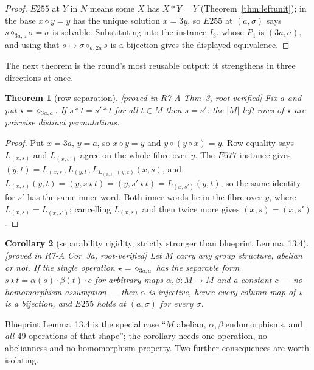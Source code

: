 \documentclass[11pt]{article}
\theoremstyle{plain}
\newtheorem{theorem}{Theorem}[section]
\newtheorem{corollary}[theorem]{Corollary}
\theoremstyle{definition}
\theoremstyle{remark}
\numberwithin{equation}{section}
\newcommand{\op}{\mathbin{*}}
\newcommand{\statusbox}[1]{{\small\sloppy\textsf{[#1]}}}
\newcommand{\PROVED}[1]{\statusbox{proved in #1, root-verified}}
\begin{document}
\begin{proof}
$E255$ at $Y$ in $N$ means some $X$ has $X\op Y = Y$
(Theorem~\ref{thm:leftunit}); in the base $x\diamond y = y$ has the unique
solution $x = 3y$, so $E255$ at $(a,\sigma)$ says $s\diamond_{3a,a}\sigma = \sigma$
is solvable. Substituting into the instance $I_3$, whose $P_4$ is $(3a,a)$, and
using that $s\mapsto\sigma\diamond_{a,2a}s$ is a bijection gives the displayed
equivalence.
\end{proof}

The next theorem is the round's most reusable output: it strengthens
\cite[Lemma~13.4]{blueprint} in three directions at once.

\begin{theorem}[row separation]\label{thm:rowsep}
\PROVED{R7-A Thm~3}
Fix $a$ and put $\star = \diamond_{3a,a}$. If $s\op t = s'\op t$ for \emph{all}
$t\in M$ then $s = s'$: the $|M|$ left rows of $\star$ are pairwise distinct
permutations.
\end{theorem}

\begin{proof}
Put $x = 3a$, $y = a$, so $x\diamond y = y$ and $y\diamond(y\diamond x) = y$. Row
equality says $L_{(x,s)}$ and $L_{(x,s')}$ agree on the whole fibre over $y$. The
$E677$ instance gives $(y,t) = L_{(x,s)}L_{(y,t)}L_{L_{(x,s)}(y,t)}(x,s)$, and
$L_{(x,s)}(y,t) = (y,s\star t) = (y,s'\star t) = L_{(x,s')}(y,t)$, so the same
identity for $s'$ has the same inner word. Both inner words lie in the fibre over
$y$, where $L_{(x,s)} = L_{(x,s')}$; cancelling $L_{(x,s)}$ and then twice more
gives $(x,s) = (x,s')$.
\end{proof}

\begin{corollary}[separability rigidity, strictly stronger than blueprint Lemma~13.4]\label{cor:separable}
\PROVED{R7-A Cor~3a}
Let $M$ carry \emph{any} group structure, abelian or not. If the \emph{single}
operation $\star = \diamond_{3a,a}$ has the separable form
$s\star t = \alpha(s)\cdot\beta(t)\cdot c$ for \emph{arbitrary maps}
$\alpha,\beta : M\to M$ and a constant $c$ --- no homomorphism assumption --- then
$\alpha$ is injective, hence every column map of $\star$ is a bijection, and
$E255$ holds at $(a,\sigma)$ for every $\sigma$.
\end{corollary}

Blueprint Lemma~13.4 is the special case ``$M$ abelian, $\alpha,\beta$
endomorphisms, and \emph{all $49$} operations of that shape''; the corollary
needs one operation, no abelianness and no homomorphism property. Two further
consequences are worth isolating.
\end{document}
